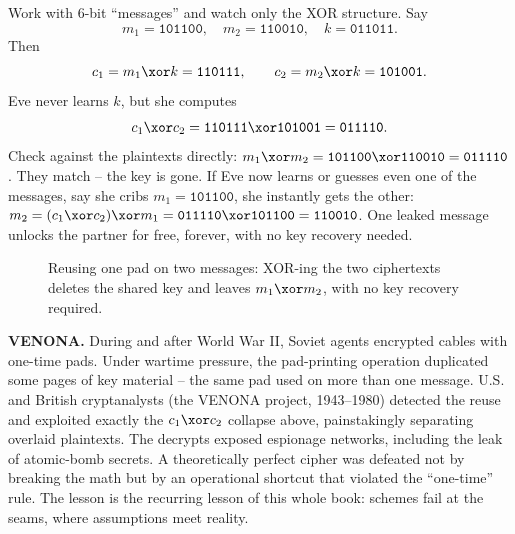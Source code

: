 \begin{example}
\label{ch09:reuse-example}
Work with $6$-bit ``messages'' and watch only the XOR structure. Say
\[
  m_1 = \texttt{101100},\quad m_2 = \texttt{110010},\quad k = \texttt{011011}.
\]
Then
\[
  c_1 = m_1 \xor k = \texttt{110111},\qquad c_2 = m_2 \xor k = \texttt{101001}.
\]
Eve never learns $k$, but she computes
\[
  c_1 \xor c_2 = \texttt{110111} \xor \texttt{101001} = \texttt{011110}.
\]
Check against the plaintexts directly: $m_1 \xor m_2 = \texttt{101100} \xor \texttt{110010} = \texttt{011110}$. They match -- the key is gone. If Eve now learns or guesses even one of the messages, say she cribs $m_1 = \texttt{101100}$, she instantly gets the other: $m_2 = (c_1\xor c_2)\xor m_1 = \texttt{011110}\xor\texttt{101100} = \texttt{110010}$. One leaked message unlocks the partner for free, forever, with no key recovery needed.
\end{example}

\begin{figure}[H]
\centering
{}
\caption{Reusing one pad on two messages: XOR-ing the two ciphertexts deletes the
shared key and leaves $m_1\xor m_2$, with no key recovery required.}
\label{ch09:fig-twotime}
\end{figure}

\begin{historybox}
\textbf{VENONA.} During and after World War II, Soviet agents encrypted cables with one-time pads. Under wartime pressure, the pad-printing operation duplicated some pages of key material -- the same pad used on more than one message. U.S. and British cryptanalysts (the VENONA project, 1943--1980) detected the reuse and exploited exactly the $c_1 \xor c_2$ collapse above, painstakingly separating overlaid plaintexts. The decrypts exposed espionage networks, including the leak of atomic-bomb secrets. A theoretically perfect cipher was defeated not by breaking the math but by an operational shortcut that violated the ``one-time'' rule. The lesson is the recurring lesson of this whole book: schemes fail at the seams, where assumptions meet reality.
\end{historybox}

